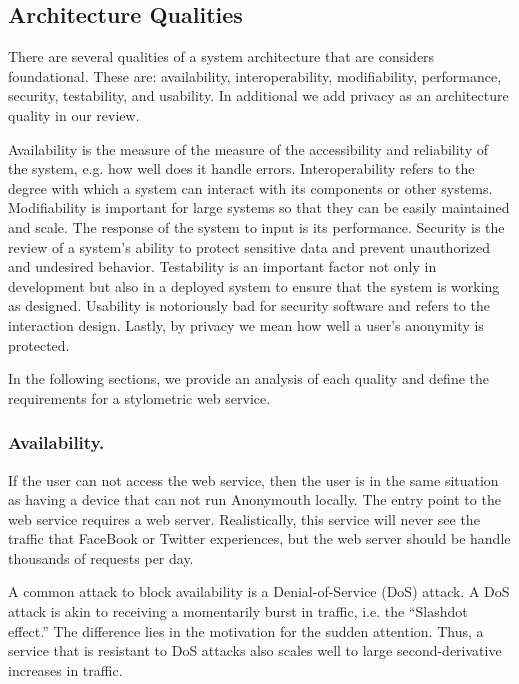 \documentclass[letterpaper]{article}
\begin{document}
\subsection{Architecture Qualities}
There are several qualities of a system architecture that are
considers foundational\cite{Bass:2012:SAP:2392670}.  These are: availability,
interoperability, modifiability, performance, security, testability,
and usability.  In additional we add privacy as an architecture
quality in our review.

Availability is the measure of the measure of the accessibility and
reliability of the system, e.g. how well does it handle errors.
Interoperability refers to the degree with which a system can interact
with its components or other systems.  Modifiability is important for
large systems so that they can be easily maintained and scale.  The
response of the system to input is its performance.  Security is the
review of a system's ability to protect sensitive data and prevent
unauthorized and undesired behavior.  Testability is an important
factor not only in development but also in a deployed system to ensure
that the system is working as designed.  Usability is notoriously bad
for security software \cite{Whitten:1999:WJC:1251421.1251435} and
refers to the interaction design.  Lastly, by privacy we mean how well
a user's anonymity is protected.

In the following sections, we provide an analysis of each quality and
define the requirements for a stylometric web service.


\subsubsection{Availability.}

If the user can not access the web service, then the user is in the
same situation as having a device that can not run Anonymouth
locally.  The entry point to the web service requires a web server.
Realistically, this service will never see the traffic that FaceBook
or Twitter experiences, but the web server should be handle thousands
of requests per day.

A common attack to block availability is a Denial-of-Service (DoS)
attack.  A DoS attack is akin to receiving a momentarily burst in
traffic, i.e. the ``Slashdot effect.''  The difference lies in the
motivation for the sudden attention.  Thus, a service that is
resistant to DoS attacks also scales well to large second-derivative
increases in traffic.
\end{document}
